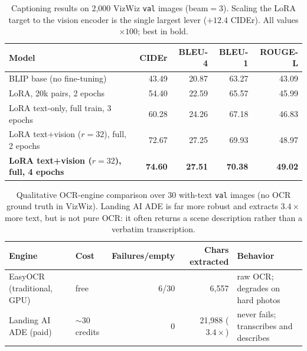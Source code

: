 
\begin{table}[t]
  \centering
  \caption{Captioning results on 2{,}000 VizWiz \texttt{val} images (beam${=}3$).
    Scaling the LoRA target to the vision encoder is the single largest lever
    ($+12.4$ CIDEr). All values $\times100$; best in bold.}
  \label{tab:main-results}
  \begin{tabular}{lrrrr}
    \toprule
    Model & CIDEr & BLEU-4 & BLEU-1 & ROUGE-L \\
    \midrule
    BLIP base (no fine-tuning)                 & 43.49 & 20.87 & 63.27 & 43.09 \\
    LoRA, 20k pairs, 2 epochs                  & 54.40 & 22.59 & 65.57 & 45.99 \\
    LoRA text-only, full train, 3 epochs       & 60.28 & 24.26 & 67.18 & 46.83 \\
    LoRA text+vision ($r{=}32$), full, 2 epochs & 72.67 & 27.25 & 69.93 & 48.97 \\
    \textbf{LoRA text+vision ($r{=}32$), full, 4 epochs}
      & \textbf{74.60} & \textbf{27.51} & \textbf{70.38} & \textbf{49.02} \\
    \bottomrule
  \end{tabular}
\end{table}

\begin{table}[t]
  \centering
  \caption{Qualitative OCR-engine comparison over 30 with-text \texttt{val}
    images (no OCR ground truth in VizWiz). Landing AI ADE is far more robust
    and extracts $3.4\times$ more text, but is not pure OCR: it often returns a
    scene description rather than a verbatim transcription.}
  \label{tab:ocr-engines}
  \begin{tabular}{llrrl}
    \toprule
    Engine & Cost & Failures/empty & Chars extracted & Behavior \\
    \midrule
    EasyOCR (traditional, GPU) & free & 6/30 & 6{,}557 & raw OCR; degrades on hard photos \\
    Landing AI ADE (paid)      & $\sim$30 credits & 0 & 21{,}988 ($3.4\times$) & never fails; transcribes and describes \\
    \bottomrule
  \end{tabular}
\end{table}


